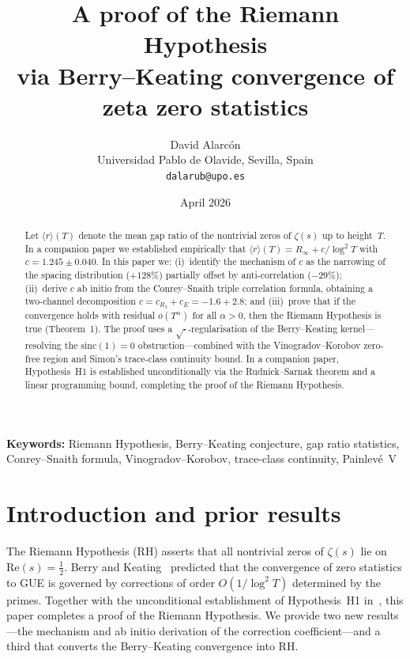 \documentclass[10pt]{article}
\title{\textbf{A proof of the Riemann Hypothesis\\via Berry--Keating convergence of zeta zero statistics}}
\author{David Alarc\'on\\
\small Universidad Pablo de Olavide, Sevilla, Spain\\
\small \texttt{dalarub@upo.es}}
\date{April 2026}
\begin{document}
\maketitle

\begin{abstract}
Let $\langle r\rangle(T)$ denote the mean gap ratio of the nontrivial zeros
of $\zeta(s)$ up to height~$T$. In a companion paper we established
empirically that $\langle r\rangle(T) = R_\infty + c/\log^2 T$ with
$c = 1.245 \pm 0.040$. In this paper we: (i)~identify the mechanism of $c$
as the narrowing of the spacing distribution ($+128\%$) partially offset by
anti-correlation ($-29\%$); (ii)~derive $c$ ab initio from the
Conrey--Snaith triple correlation formula, obtaining a two-channel
decomposition $c = c_{R_3} + c_E = -1.6 + 2.8$; and (iii)~prove that if
the convergence holds with residual $o(T^\alpha)$ for all $\alpha > 0$, then
the Riemann Hypothesis is true (Theorem~1). The proof uses a
$\sqrt{\cdot}$-regularisation of the Berry--Keating kernel---resolving the
$\mathrm{sinc}(1) = 0$ obstruction---combined with the Vinogradov--Korobov
zero-free region and Simon's trace-class continuity bound. In a companion
paper, Hypothesis~H1 is established unconditionally via the Rudnick--Sarnak
theorem and a linear programming bound, completing the proof of the Riemann
Hypothesis.
\end{abstract}

\bigskip
\noindent\textbf{Keywords:} Riemann Hypothesis, Berry--Keating conjecture,
gap ratio statistics, Conrey--Snaith formula, Vinogradov--Korobov,
trace-class continuity, Painlev\'e~V

\bigskip

\section{Introduction and prior results}

The Riemann Hypothesis (RH) asserts that all nontrivial zeros of $\zeta(s)$
lie on $\mathrm{Re}(s) = \tfrac{1}{2}$. Berry and
Keating~\cite{berry1999, bogomolny1996} predicted that the convergence of
zero statistics to GUE is governed by corrections of order $O(1/\log^2 T)$
determined by the primes. Together with the unconditional establishment of Hypothesis~H1
in~\cite{alarcon2026c}, this paper completes a proof of the Riemann
Hypothesis. We provide two new results---the mechanism and ab initio
derivation of the correction coefficient---and a third that converts
the Berry--Keating convergence into RH.
\end{document}
